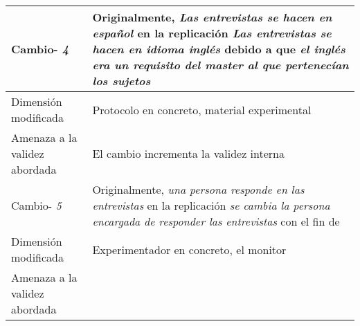 \begin{table}
\begin{tabular}{| p{3.3cm} | p{9cm} |}
Cambio- \textit{4}   & \parbox[t]{9cm} {Originalmente,  \textit{ Las entrevistas se hacen en español } } \parbox[t]{9cm}{en la replicación \textit{ Las entrevistas se hacen en idioma inglés} }  debido a que \textit{el inglés era un requisito del master al que pertenecían los sujetos } \\  \hline
Dimensión modificada & 
  Protocolo en concreto, material experimental    \\  \hline 
Amenaza a la validez abordada  & El cambio incrementa la validez  interna   \\  \hline \hline 

Cambio- \textit{5}   & \parbox[t]{9cm} {Originalmente,  \textit{ una persona responde en las entrevistas } } \parbox[t]{9cm}{en la replicación \textit{ se cambia la persona encargada de responder las entrevistas} }  con el fin de  \textit{ } \\  \hline
Dimensión modificada & 
  Experimentador en concreto, el monitor    \\  \hline 
Amenaza a la validez abordada  &    \\  \hline

\end{tabular}
\label{tab:Ale-2009}
\end{table}



